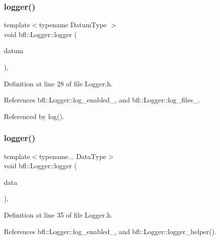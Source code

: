 \subsubsection{\texorpdfstring{logger()}{logger()}\hspace{0.1cm}{\footnotesize\ttfamily [1/4]}}
{\footnotesize\ttfamily template$<$typename Datum\+Type $>$ \\
void bfl\+::\+Logger\+::logger (\begin{DoxyParamCaption}\item[{Datum\+Type}]{datum }\end{DoxyParamCaption})\hspace{0.3cm}{\ttfamily [inline]}, {\ttfamily [inherited]}}



Definition at line 28 of file Logger.\+h.



References bfl\+::\+Logger\+::log\+\_\+enabled\+\_\+, and bfl\+::\+Logger\+::log\+\_\+files\+\_\+.



Referenced by log().

\mbox{\label{classbfl_1_1Logger_aca2086c9256e5c404872b91f7f25b97d}} 
\subsubsection{\texorpdfstring{logger()}{logger()}\hspace{0.1cm}{\footnotesize\ttfamily [2/4]}}
{\footnotesize\ttfamily template$<$typename... Data\+Type$>$ \\
void bfl\+::\+Logger\+::logger (\begin{DoxyParamCaption}\item[{Data\+Type...}]{data }\end{DoxyParamCaption})\hspace{0.3cm}{\ttfamily [inline]}, {\ttfamily [inherited]}}



Definition at line 35 of file Logger.\+h.



References bfl\+::\+Logger\+::log\+\_\+enabled\+\_\+, and bfl\+::\+Logger\+::logger\+\_\+helper().


